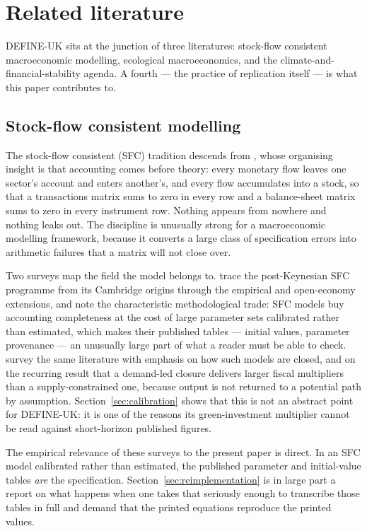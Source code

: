\section{Related literature}
\label{sec:literature}

DEFINE-UK sits at the junction of three literatures: stock-flow consistent macroeconomic modelling, ecological macroeconomics, and the climate-and-financial-stability agenda. A fourth --- the practice of replication itself --- is what this paper contributes to.

\subsection{Stock-flow consistent modelling}

The stock-flow consistent (SFC) tradition descends from \citet{godley2007}, whose organising insight is that accounting comes before theory: every monetary flow leaves one sector's account and enters another's, and every flow accumulates into a stock, so that a transactions matrix sums to zero in every row and a balance-sheet matrix sums to zero in every instrument row. Nothing appears from nowhere and nothing leaks out. The discipline is unusually strong for a macroeconomic modelling framework, because it converts a large class of specification errors into arithmetic failures that a matrix will not close over.

Two surveys map the field the model belongs to. \citet{caverzasi2015} trace the post-Keynesian SFC programme from its Cambridge origins through the empirical and open-economy extensions, and note the characteristic methodological trade: SFC models buy accounting completeness at the cost of large parameter sets calibrated rather than estimated, which makes their published tables --- initial values, parameter provenance --- an unusually large part of what a reader must be able to check. \citet{nikiforos2017} survey the same literature with emphasis on how such models are closed, and on the recurring result that a demand-led closure delivers larger fiscal multipliers than a supply-constrained one, because output is not returned to a potential path by assumption. Section~\ref{sec:calibration} shows that this is not an abstract point for DEFINE-UK: it is one of the reasons its green-investment multiplier cannot be read against short-horizon published figures.

The empirical relevance of these surveys to the present paper is direct. In an SFC model calibrated rather than estimated, the published parameter and initial-value tables \emph{are} the specification. Section~\ref{sec:reimplementation} is in large part a report on what happens when one takes that seriously enough to transcribe those tables in full and demand that the printed equations reproduce the printed values.

